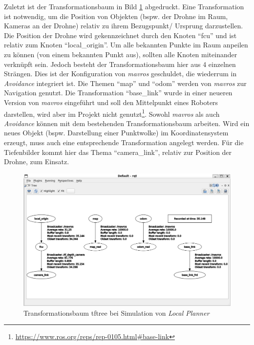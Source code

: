 Zuletzt ist der Transformationsbaum in Bild \ref{fig:sim_gazebo_tftree} abgedruckt. Eine Transformation ist notwendig, um die Position von Objekten (bspw. der Drohne im Raum, Kameras an der Drohne) relativ zu ihrem Bezugspunkt/ Ursprung darzustellen. Die Position der Drohne wird gekennzeichnet durch den Knoten \enquote{fcu} und ist relativ zum Knoten \enquote{local\_origin}. Um alle bekannten Punkte im Raum anpeilen zu können (von einem bekannten Punkt aus), sollten alle Knoten miteinander verknüpft sein. Jedoch besteht der Transformationsbaum hier aus 4 einzelnen Strängen. Dies ist der Konfiguration von \textit{mavros} geschuldet, die wiederrum in \textit{Avoidance} integriert ist. Die Themen \enquote{map} und \enquote{odom} werden von \textit{mavros} zur Navigation genutzt. Die Transformation \enquote{base\_link} wurde in einer neueren Version von \textit{mavros} eingeführt und soll den Mittelpunkt eines Roboters darstellen, wird aber im Projekt nicht genutzt\footnote{\url{https://www.ros.org/reps/rep-0105.html\#base-link}}. Sowohl \textit{mavros} als auch \textit{Avoidance} können mit dem bestehenden Transformationsbaum arbeiten. Wird ein neues Objekt (bspw. Darstellung einer Punktwolke) im Koordinatensystem 
erzeugt, muss auch eine entsprechende Transformation angelegt werden. Für die Tiefenbilder kommt hier das Thema \enquote{camera\_link}, relativ zur Position der Drohne, zum Einsatz.
\begin{figure}[!h]
    \centering
    \includegraphics[width=\linewidth]{images/sim_gazebo_tftree.png}
    \caption{Transformationsbaum tftree bei Simulation von \textit{Local Planner}}
    \label{fig:sim_gazebo_tftree}
\end{figure}


